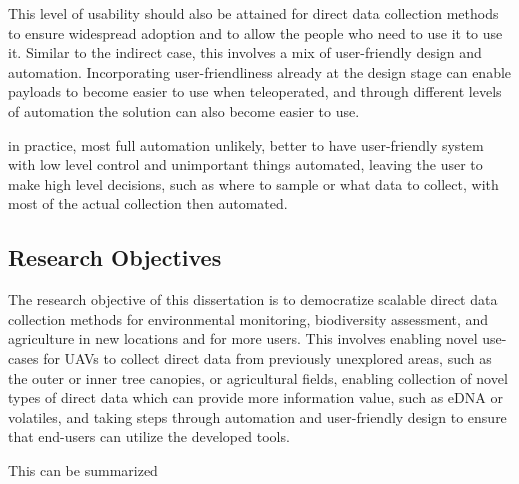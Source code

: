This level of usability should also be attained for direct data collection methods to ensure widespread adoption and to allow the people who need to use it to use it. Similar to the indirect case, this involves a mix of user-friendly design and automation. Incorporating user-friendliness already at the design stage can enable payloads to become easier to use when teleoperated, and through different levels of automation the solution can also become easier to use. 

in practice, most full automation unlikely, better to have user-friendly system with low level control and unimportant things automated, leaving the user to make high level decisions, such as where to sample or what data to collect, with most of the actual collection then automated.

\subsection{Research Objectives}

The research objective of this dissertation is to democratize scalable direct data collection methods for environmental monitoring, biodiversity assessment, and agriculture in new locations and for more users. This involves enabling novel use-cases for UAVs to collect direct data from previously unexplored areas, such as the outer or inner tree canopies, or agricultural fields, enabling collection of novel types of direct data which can provide more information value, such as eDNA or volatiles, and taking steps through automation and user-friendly design to ensure that end-users can utilize the developed tools. 

This can be summarized 




